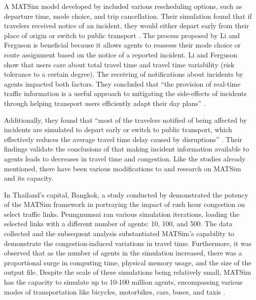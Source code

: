 \documentclass[
  letterpaper,
  authoryear]{elsarticle}
\begin{document}
A MATSim model developed by \citet{li2020} included various rescheduling
options, such as departure time, mode choice, and trip cancellation.
Their simulation found that if travelers received notice of an incident,
they would either depart early from their place of origin or switch to
public transport \citep{li2020}. The process proposed by Li and Ferguson
is beneficial because it allows agents to reassess their mode choice or
route assignment based on the notice of a reported incident. Li and
Ferguson show that users care about total travel time and travel time
variability (risk tolerance to a certain degree). The receiving of
notifications about incidents by agents impacted both factors. They
concluded that ``the provision of real-time traffic information is a
useful approach to mitigating the side-effects of incidents through
helping transport users efficiently adapt their day plans'' \citep[
p.96]{li2020}.

Additionally, they found that ``most of the travelers notified of being
affected by incidents are simulated to depart early or switch to public
transport, which effectively reduces the average travel time delay
caused by disruptions'' \citep[ p.96]{li2020}. Their findings validate
the conclusions of \citet{sisiopiku2007} that making incident
information available to agents leads to decreases in travel time and
congestion. Like the studies already mentioned, there have been various
modifications to and research on MATSim and its capacity.

In Thailand's capital, Bangkok, a study conducted by
\citet{peungnumsai2019} demonstrated the potency of the MATSim framework
in portraying the impact of rush hour congestion on select traffic
links. Peungnumsai ran various simulation iterations, loading the
selected links with a different number of agents: 10, 100, and 500. The
data collected and the subsequent analysis substantiated MATSim's
capability to demonstrate the congestion-induced variations in travel
time. Furthermore, it was observed that as the number of agents in the
simulation increased, there was a proportional surge in computing time,
physical memory usage, and the size of the output file. Despite the
scale of these simulations being relatively small, MATSim has the
capacity to simulate up to 10-100 million agents, encompassing various
modes of transportation like bicycles, motorbikes, cars, buses, and
taxis \citep{peungnumsai2019}.
\end{document}
